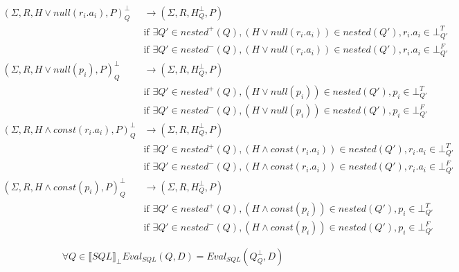 \begin{mydef}
	\begin{align*}
		(\Sigma,R,H \lor null(r_i.a_i),P)^\bot_Q & \rightarrow (\Sigma,R,H^\bot_{Q},P) \\
		& \mbox{if } \exists Q' \in nested^+(Q), (H\lor null(r_i.a_i)) \in nested(Q'), r_i.a_i \in \bot^T_{Q'} \\
		& \mbox{if } \exists Q' \in nested^-(Q), (H\lor null(r_i.a_i)) \in nested(Q'), r_i.a_i \in \bot^F_{Q'} \\
		(\Sigma,R,H \lor null(p_i),P)^\bot_Q & \rightarrow (\Sigma,R,H^\bot_{Q},P) \\
		& \mbox{if } \exists Q' \in nested^+(Q), (H\lor null(p_i)) \in nested(Q'), p_i \in \bot^T_{Q'} \\
		& \mbox{if } \exists Q' \in nested^-(Q), (H\lor null(p_i)) \in nested(Q'), p_i \in \bot^F_{Q'} \\
		(\Sigma,R,H \land const(r_i.a_i),P)^\bot_Q & \rightarrow (\Sigma,R,H^\bot_{Q},P) \\
		& \mbox{if } \exists Q' \in nested^+(Q), (H\land const(r_i.a_i)) \in nested(Q'), r_i.a_i \in \bot^T_{Q'} \\
		& \mbox{if } \exists Q' \in nested^-(Q), (H\land const(r_i.a_i)) \in nested(Q'), r_i.a_i \in \bot^F_{Q'} \\
		(\Sigma,R,H \land const(p_i),P)^\bot_Q & \rightarrow (\Sigma,R,H^\bot_{Q},P) \\
		& \mbox{if } \exists Q' \in nested^+(Q), (H\land const(p_i)) \in nested(Q'), p_i \in \bot^T_{Q'} \\
		& \mbox{if } \exists Q' \in nested^-(Q), (H\land const(p_i)) \in nested(Q'), p_i \in \bot^F_{Q'} \
	\end{align*}
\end{mydef}



\begin{myprop}
	$$\forall Q \in \llbracket SQL \rrbracket_\bot Eval_{SQL}(Q,D) = Eval_{SQL}(Q^\bot_Q,D)$$
\end{myprop}


